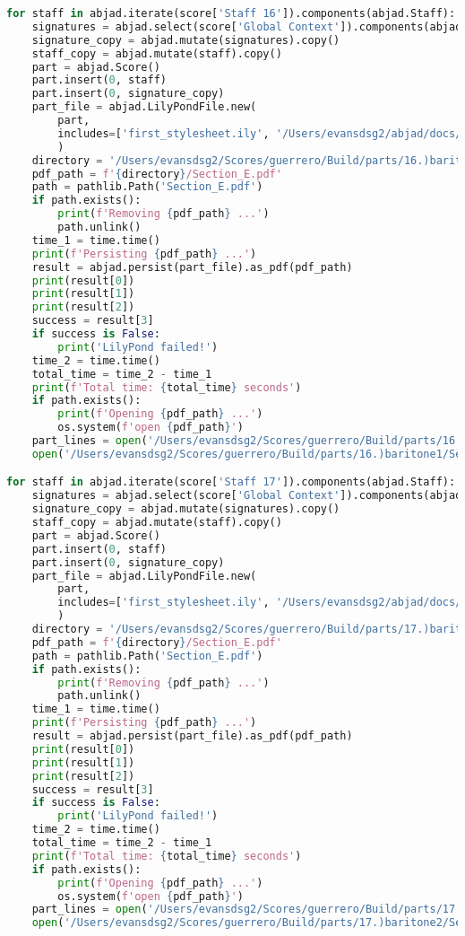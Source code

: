 \begin{lstlisting}[language=Python, caption=Invocation Source Code]
for staff in abjad.iterate(score['Staff 16']).components(abjad.Staff):
    signatures = abjad.select(score['Global Context']).components(abjad.Staff)
    signature_copy = abjad.mutate(signatures).copy()
    staff_copy = abjad.mutate(staff).copy()
    part = abjad.Score()
    part.insert(0, staff)
    part.insert(0, signature_copy)
    part_file = abjad.LilyPondFile.new(
        part,
        includes=['first_stylesheet.ily', '/Users/evansdsg2/abjad/docs/source/_stylesheets/abjad.ily'],
        )
    directory = '/Users/evansdsg2/Scores/guerrero/Build/parts/16.)baritone1'
    pdf_path = f'{directory}/Section_E.pdf'
    path = pathlib.Path('Section_E.pdf')
    if path.exists():
        print(f'Removing {pdf_path} ...')
        path.unlink()
    time_1 = time.time()
    print(f'Persisting {pdf_path} ...')
    result = abjad.persist(part_file).as_pdf(pdf_path)
    print(result[0])
    print(result[1])
    print(result[2])
    success = result[3]
    if success is False:
        print('LilyPond failed!')
    time_2 = time.time()
    total_time = time_2 - time_1
    print(f'Total time: {total_time} seconds')
    if path.exists():
        print(f'Opening {pdf_path} ...')
        os.system(f'open {pdf_path}')
    part_lines = open('/Users/evansdsg2/Scores/guerrero/Build/parts/16.)baritone1/Section_E.ly').readlines()
    open('/Users/evansdsg2/Scores/guerrero/Build/parts/16.)baritone1/Section_E.ly', 'w').writelines(part_lines[15:-1])

for staff in abjad.iterate(score['Staff 17']).components(abjad.Staff):
    signatures = abjad.select(score['Global Context']).components(abjad.Staff)
    signature_copy = abjad.mutate(signatures).copy()
    staff_copy = abjad.mutate(staff).copy()
    part = abjad.Score()
    part.insert(0, staff)
    part.insert(0, signature_copy)
    part_file = abjad.LilyPondFile.new(
        part,
        includes=['first_stylesheet.ily', '/Users/evansdsg2/abjad/docs/source/_stylesheets/abjad.ily'],
        )
    directory = '/Users/evansdsg2/Scores/guerrero/Build/parts/17.)baritone2'
    pdf_path = f'{directory}/Section_E.pdf'
    path = pathlib.Path('Section_E.pdf')
    if path.exists():
        print(f'Removing {pdf_path} ...')
        path.unlink()
    time_1 = time.time()
    print(f'Persisting {pdf_path} ...')
    result = abjad.persist(part_file).as_pdf(pdf_path)
    print(result[0])
    print(result[1])
    print(result[2])
    success = result[3]
    if success is False:
        print('LilyPond failed!')
    time_2 = time.time()
    total_time = time_2 - time_1
    print(f'Total time: {total_time} seconds')
    if path.exists():
        print(f'Opening {pdf_path} ...')
        os.system(f'open {pdf_path}')
    part_lines = open('/Users/evansdsg2/Scores/guerrero/Build/parts/17.)baritone2/Section_E.ly').readlines()
    open('/Users/evansdsg2/Scores/guerrero/Build/parts/17.)baritone2/Section_E.ly', 'w').writelines(part_lines[15:-1])


\end{lstlisting}
